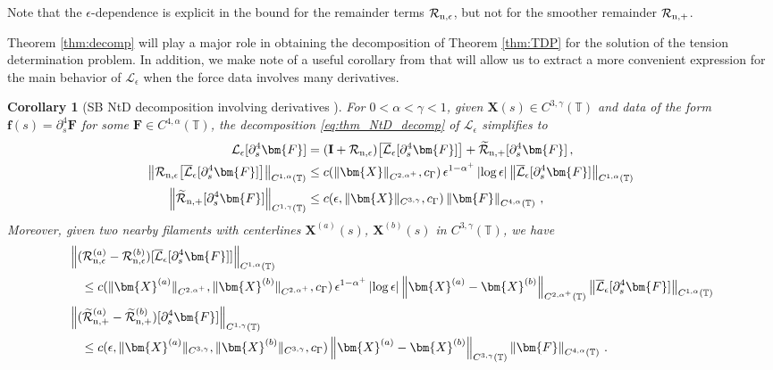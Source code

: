 \documentclass[11pt,reqno]{amsart}
\newcommand{\T}{\mathbb{T}}
\newcommand{\X}{\bm{X}}
\newcommand{\p}{\partial}
\newcommand{\abs}[1]{\left\lvert #1 \right\rvert}
\newcommand{\norm}[1]{\left\lVert #1 \right\rVert}
\newcommand{\wt}[1]{\widetilde{#1}}
\newcommand{\mc}[1]{\mathcal{#1}}
\newtheorem{corollary}[theorem]{Corollary}
\theoremstyle{definition}
\begin{document}
Note that the $\epsilon$-dependence is explicit in the bound for the remainder terms $\mc{R}_{\rm n,\epsilon}$, but not for the smoother remainder $\mc{R}_{\rm n,+}$.

Theorem \ref{thm:decomp} will play a major role in obtaining the decomposition of Theorem \ref{thm:TDP} for the solution of the tension determination problem. In addition, we make note of a useful corollary from \cite[Corollary 1.6]{ohm2024free} that will allow us to extract a more convenient expression for the main behavior of $\mc{L}_\epsilon$ when the force data involves many derivatives. 
%
%
\begin{corollary}[SB NtD decomposition involving derivatives \cite{ohm2024free}]\label{cor:four_derivs}
For $0<\alpha<\gamma<1$, given $\X(s)\in C^{3,\gamma}(\T)$ and data of the form $\bm{f}(s)=\p_s^4\bm{F}$ for some $\bm{F}\in C^{4,\alpha}(\T)$, the decomposition \eqref{eq:thm_NtD_decomp} of $\mc{L}_\epsilon$ simplifies to 
\begin{equation}\label{eq:F_NtD_decomp}
\begin{aligned}
\mc{L}_\epsilon[\p_s^4\bm{F}]&= ({\bf I}+\mc{R}_{\rm n,\epsilon})\big[\overline{\mc{L}}_\epsilon[\p_s^4\bm{F}]\big] +\wt{\mc{R}}_{\rm n,+}[\p_s^4\bm{F}]\,,\\
%
\norm{\mc{R}_{\rm n,\epsilon}\big[\overline{\mc{L}}_\epsilon[\p_s^4\bm{F}]\big]}_{C^{1,\alpha}(\T)} &\le c(\|\X\|_{C^{2,\alpha^+}},c_\Gamma)\, \epsilon^{1-\alpha^+}\abs{\log\epsilon}\norm{\overline{\mc{L}}_\epsilon[\p_s^4\bm{F}]}_{C^{1,\alpha}(\T)}\\
%
\norm{\wt{\mc{R}}_{\rm n,+}[\p_s^4\bm{F}]}_{C^{1,\gamma}(\T)} &\le c(\epsilon,\|\X\|_{C^{3,\gamma}},c_\Gamma)\norm{\bm{F}}_{C^{4,\alpha}(\T)}\,,
\end{aligned}
\end{equation}
%
%
Moreover, given two nearby filaments with centerlines $\X^{(a)}(s)$, $\X^{(b)}(s)$ in $C^{3,\gamma}(\T)$, we have
\begin{equation}\label{eq:F_NtD_ests_lip}
\begin{aligned}
&\norm{(\mc{R}_{\rm n,\epsilon}^{(a)}-\mc{R}_{\rm n,\epsilon}^{(b)})[\overline{\mc{L}}_\epsilon[\p_s^4\bm{F}]]}_{C^{1,\alpha}(\T)} \\
&\quad\le c(\|\X^{(a)}\|_{C^{2,\alpha^+}},\|\X^{(b)}\|_{C^{2,\alpha^+}},c_\Gamma)\, \epsilon^{1-\alpha^+}\abs{\log\epsilon}\norm{\X^{(a)}-\X^{(b)}}_{C^{2,\alpha^+}(\T)}\norm{\overline{\mc{L}}_\epsilon[\p_s^4\bm{F}]}_{C^{1,\alpha}(\T)} \\
%
&\norm{(\wt{\mc{R}}_{\rm n,+}^{(a)}-\wt{\mc{R}}_{\rm n,+}^{(b)})[\p_s^4\bm{F}]}_{C^{1,\gamma}(\T)}\\
&\quad\le c(\epsilon,\|\X^{(a)}\|_{C^{3,\gamma}},\|\X^{(b)}\|_{C^{3,\gamma}},c_\Gamma)\norm{\X^{(a)}-\X^{(b)}}_{C^{3,\gamma}(\T)}\norm{\bm{F}}_{C^{4,\alpha}(\T)}\,.
\end{aligned}
\end{equation}
\end{corollary}
\end{document}
